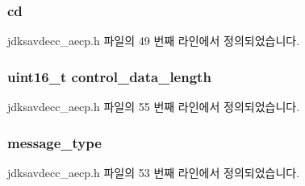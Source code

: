 \subsubsection[{\texorpdfstring{cd}{cd}}]{ cd}\hypertarget{structjdksavdecc__aecpdu__common__control__header_a8bdacfca3faaf5f7d020bbe533855525}{}\label{structjdksavdecc__aecpdu__common__control__header_a8bdacfca3faaf5f7d020bbe533855525}


jdksavdecc\+\_\+aecp.\+h 파일의 49 번째 라인에서 정의되었습니다.

\subsubsection[{\texorpdfstring{control\+\_\+data\+\_\+length}{control_data_length}}]{\setlength{\rightskip}{0pt plus 5cm}uint16\+\_\+t control\+\_\+data\+\_\+length}\hypertarget{structjdksavdecc__aecpdu__common__control__header_acc7cd70455e6e455ac498477b95f9e21}{}\label{structjdksavdecc__aecpdu__common__control__header_acc7cd70455e6e455ac498477b95f9e21}


jdksavdecc\+\_\+aecp.\+h 파일의 55 번째 라인에서 정의되었습니다.

\subsubsection[{\texorpdfstring{message\+\_\+type}{message_type}}]{ message\+\_\+type}\hypertarget{structjdksavdecc__aecpdu__common__control__header_aeaaffeace8c23899e558022f62ce6de4}{}\label{structjdksavdecc__aecpdu__common__control__header_aeaaffeace8c23899e558022f62ce6de4}


jdksavdecc\+\_\+aecp.\+h 파일의 53 번째 라인에서 정의되었습니다.

